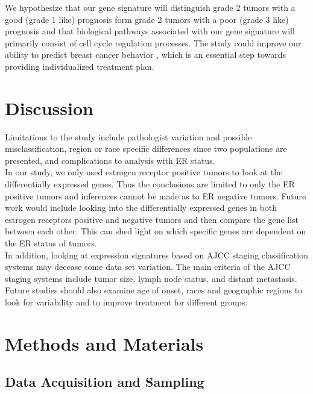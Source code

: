 \documentclass[a4paper,10pt]{article}
\begin{document}
We hypothesize that our gene signature will distinguish grade 2 tumors with a good (grade 1 like) 
prognosis form grade 2 tumors with a poor (grade 3 like) prognosis and that biological pathways 
associated with our gene signature will primarily consist of cell cycle regulation processes.  
The study could improve our ability to predict breast cancer behavior , which is an essential step towards providing 
individualized treatment  plan.\\
\section{Discussion}
Limitations to the study include pathologist variation and possible misclassification, region or 
race specific differences since two populations are presented, and complications to analysis with ER status. \\

In our study, we only used estrogen receptor positive tumors to look at the differentially 
expressed genes. Thus the conclusions are limited to only the ER positive tumors and 
inferences cannot be made as to ER negative tumors. Future work would include looking into the
 differentially expressed genes in both estrogen receptors positive and negative tumors and then
 compare the gene list between each other. This can shed light on which specific genes are dependent 
on the ER status of tumors. \\

In addition, looking at expression signatures based on AJCC staging classification systems 
may decease some data set variation. The main criteria of the AJCC staging 
systems include tumor size, lymph node status, and distant metastasis. Future studies should 
also examine age of onset, races and geographic regions to look for variability and to improve 
treatment for different groups.\\ 

\section{Methods and Materials}
\subsection{Data Acquisition and Sampling}
\end{document}
